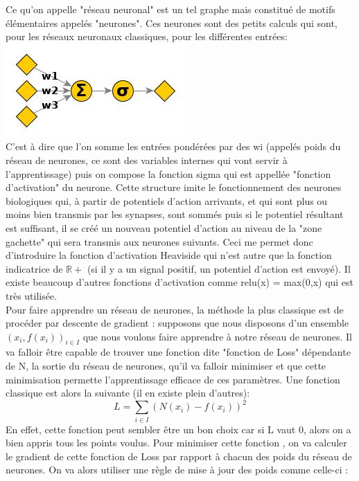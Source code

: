 \documentclass[12pt]{article}
\begin{document}
Ce qu'on appelle "réseau neuronal" est un tel graphe mais constitué de motifs élémentaires appelés "neurones". Ces neurones sont des petits calculs qui sont, pour les réseaux neuronaux classiques, pour les différentes entrées:\\
\includegraphics[scale=0.45]{ex_art_neuron.jpg}\\
C'est à dire que l'on somme les entrées pondérées par des wi (appelés poids du réseau de neurones, ce sont des variables internes qui vont servir à l'apprentissage) puis on compose la fonction sigma qui est appellée "fonction d'activation" du neurone. Cette structure imite le fonctionnement des neurones biologiques qui, à partir de potentiels d'action arrivants, et qui sont plus ou moins bien transmis par les synapses, sont sommés puis si le potentiel résultant est suffisant, il se créé un nouveau potentiel d'action au niveau de la "zone gachette" qui sera transmis aux neurones suivants. Ceci me permet donc d'introduire la fonction d'activation Heaviside qui n'est autre que la fonction indicatrice de $\mathbb{R+}$ (si il y a un signal positif, un potentiel d'action est envoyé). Il existe beaucoup d'autres fonctions d'activation comme relu(x) = max(0,x) qui est très utilisée.\\
Pour faire apprendre un réseau de neurones, la méthode la plus classique est de procéder par descente de gradient : supposons que nous disposons d'un ensemble $(x_i,f(x_i))_{i\in I}$  que nous voulons faire apprendre à notre réseau de neurones. Il va falloir être capable de trouver une fonction dite "fonction de Loss" dépendante de N, la sortie du réseau de neurones, qu'il va falloir minimiser et que cette minimisation permette l'apprentissage efficace de ces paramètres. Une fonction classique est alors la suivante (il en existe plein d'autres):
\[L = \sum_{i\in I}(N(x_i) - f(x_i))^2\]
En effet, cette fonction peut sembler être un bon choix car si L vaut 0, alors on a bien appris tous les points voulus. Pour minimiser cette fonction , on va calculer le gradient de cette fonction de Loss par rapport à chacun des poids du réseau de neurones. On va alors utiliser une règle de mise à jour des poids comme celle-ci : 
\end{document}
